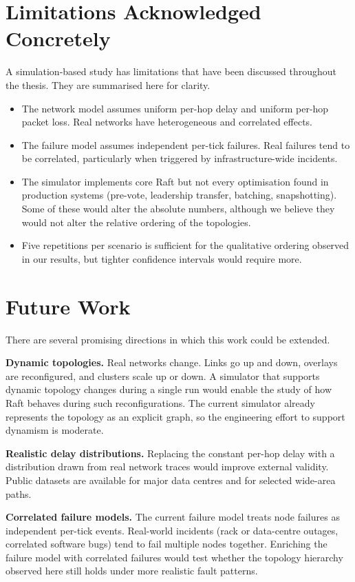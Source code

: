 \section{Limitations Acknowledged Concretely}

A simulation-based study has limitations that have been discussed throughout the thesis. They are summarised here for clarity.

\begin{itemize}
    \item The network model assumes uniform per-hop delay and uniform per-hop packet loss. Real networks have heterogeneous and correlated effects.
    \item The failure model assumes independent per-tick failures. Real failures tend to be correlated, particularly when triggered by infrastructure-wide incidents.
    \item The simulator implements core Raft but not every optimisation found in production systems (pre-vote, leadership transfer, batching, snapshotting). Some of these would alter the absolute numbers, although we believe they would not alter the relative ordering of the topologies.
    \item Five repetitions per scenario is sufficient for the qualitative ordering observed in our results, but tighter confidence intervals would require more.
\end{itemize}

\section{Future Work}
\label{sec:future_work}

There are several promising directions in which this work could be extended.

\textbf{Dynamic topologies.} Real networks change. Links go up and down, overlays are reconfigured, and clusters scale up or down. A simulator that supports dynamic topology changes during a single run would enable the study of how Raft behaves during such reconfigurations. The current simulator already represents the topology as an explicit graph, so the engineering effort to support dynamism is moderate.

\textbf{Realistic delay distributions.} Replacing the constant per-hop delay with a distribution drawn from real network traces would improve external validity. Public datasets are available for major data centres and for selected wide-area paths.

\textbf{Correlated failure models.} The current failure model treats node failures as independent per-tick events. Real-world incidents (rack or data-centre outages, correlated software bugs) tend to fail multiple nodes together. Enriching the failure model with correlated failures would test whether the topology hierarchy observed here still holds under more realistic fault patterns.

